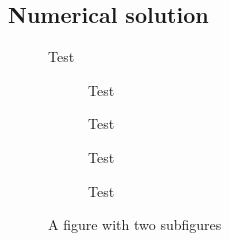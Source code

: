 
\subsection{Numerical solution}

\lipsum[1]

\begin{figure}[h]
	\centering
	\vspace{-0.75cm}
	\fbox{}
%	
	\vspace{-0.50cm}
	\caption{Test}
	\label{fig:diagonal_N200_Pe1.0e+00}
\end{figure}

\begin{figure}[h]
	\centering
	\begin{subfigure}{.5\textwidth}
		\centering
		\vspace{-0.75cm}
		
		\vspace{-0.50cm}
		\caption{Test}
		\label{fig:diagonal_N200_Pe1.0e+01}
	\end{subfigure}%
	\begin{subfigure}{.5\textwidth}
		\centering
		\vspace{-0.75cm}
		
		\vspace{-0.50cm}
		\caption{Test}
		\label{fig:diagonal_N200_Pe1.0e+02}
	\end{subfigure}
	\begin{subfigure}{.5\textwidth}
		\centering
		\vspace{-0.25cm}
		
		\vspace{-0.50cm}
		\caption{Test}
		\label{fig:diagonal_N200_Pe1.0e+03}
	\end{subfigure}%
	\begin{subfigure}{.5\textwidth}
		\centering
		\vspace{-0.25cm}
		
		\vspace{-0.50cm}
		\caption{Test}
		\label{fig:diagonal_N200_Pe1.0e+04}
	\end{subfigure}
	\caption{A figure with two subfigures}
	\label{fig:diagonal_N200_Pe_greater_than_1}
\end{figure}



